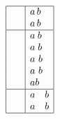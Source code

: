 \begin{equation}
\begin{array}{|l|l|}
	\hline
	\text{\hspace{0.167em}} & a \hspace{0.167em} b \\
	\text{\,} & a \, b \\
	\hline
	\text{\hspace{0.25em}} & a \hspace{0.25em} b \\
	\text{\;} & a \; b \\
	\text{\ } & a \ b \\
	\text{~} & a ~ b \\
	\text{\space} & a \space b \\
	\hline
	\text{\hspace{1em}} & a \hspace{1em} b \\
	\text{\quad} & a \quad b \\
	\hline
\end{array}
\end{equation}
